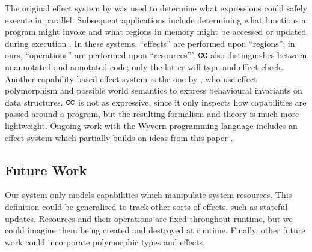 The original effect system by \cite{lucassen88} was used to determine what expressions could safely execute in parallel. Subsequent applications include determining what functions a program might invoke \cite{tang94} and what regions in memory might be accessed or updated during execution \cite{talpin94}. In these systems, ``effects'' are performed upon ``regions''; in ours, ``operations'' are performed upon ``resources'''. $\mathtt{CC}$ also distinguishes between unannotated and annotated code; only the latter will type-and-effect-check. Another capability-based effect system is the one by \cite{devriese16}, who use effect polymorphism and possible world semantics to express behavioural invariants on data structures. $\mathtt{CC}$ is not as expressive, since it only inspects how capabilities are passed around a program, but the resulting formalism and theory is much more
lightweight. Ongoing work with the Wyvern programming language includes an
effect system which partially builds on ideas from this paper \cite{melicher18}.

\subsection{Future Work}

Our system only models capabilities which manipulate system resources. This
definition could be generalised to track other sorts of effects, such as stateful
updates. Resources and their operations are fixed throughout
runtime, but we could imagine them being created and destroyed at runtime. 
Finally, other future work could incorporate polymorphic types and effects.
